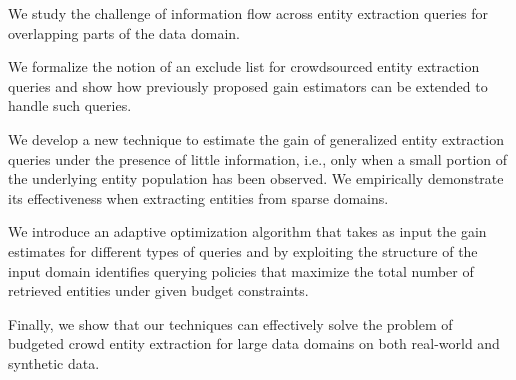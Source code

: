 \squishlist
\item We study the challenge of information flow across entity extraction queries for overlapping parts of the data domain.
\item We formalize the notion of an exclude list for crowdsourced entity extraction queries and show how previously proposed gain estimators can be extended to handle such queries.
\item We develop a new technique to estimate the gain of generalized entity extraction queries under the presence of little information, i.e., only when a small portion of the underlying entity population has been observed. We empirically demonstrate its effectiveness when extracting entities from sparse domains.
\item We introduce an adaptive optimization algorithm that takes as input the gain estimates for different types of queries and by exploiting the structure of the input domain identifies querying policies that maximize the total number of retrieved entities under given budget constraints. 
\item Finally, we show that our techniques can effectively solve the problem of budgeted crowd entity extraction for large data domains on both real-world and synthetic data.
\squishend

